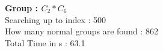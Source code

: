 \textbf{Group : $C_2*C_6$}\\
Searching up to index : 500\\
How many normal groups are found : 862\\
Total Time in s : 63.1\\
